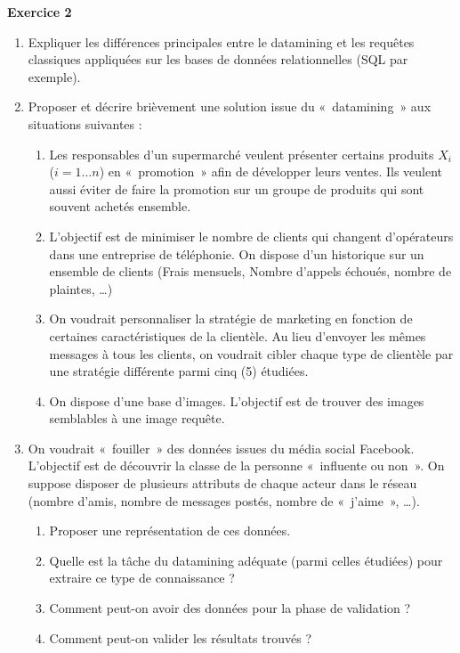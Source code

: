 \documentclass[a4paper,14pt]{article}
\begin{document}
    \vspace{1cm}
    \noindent
    \textbf{Exercice 2}
    
    \begin{enumerate}[leftmargin=*, label=\arabic*)]
        \item Expliquer les différences principales entre le datamining et les requêtes classiques appliquées sur les bases de données relationnelles (SQL par exemple).
        
        \item Proposer et décrire brièvement une solution issue du «~datamining~» aux situations suivantes :
        \begin{enumerate}[label=\alph*)]
            \item Les responsables d’un supermarché veulent présenter certains produits \( X_i \) (\( i = 1 \ldots n \)) en «~promotion~» afin de développer leurs ventes. Ils veulent aussi éviter de faire la promotion sur un groupe de produits qui sont souvent achetés ensemble.
            
            \item L’objectif est de minimiser le nombre de clients qui changent d’opérateurs dans une entreprise de téléphonie. On dispose d’un historique sur un ensemble de clients (Frais mensuels, Nombre d’appels échoués, nombre de plaintes, \ldots)
            
            \item On voudrait personnaliser la stratégie de marketing en fonction de certaines caractéristiques de la clientèle. Au lieu d’envoyer les mêmes messages à tous les clients, on voudrait cibler chaque type de clientèle par une stratégie différente parmi cinq (5) étudiées.
            
            \item On dispose d’une base d’images. L’objectif est de trouver des images semblables à une image requête.
        \end{enumerate}
        
        \item On voudrait «~fouiller~» des données issues du média social Facebook. L’objectif est de découvrir la classe de la personne «~influente ou non~». On suppose disposer de plusieurs attributs de chaque acteur dans le réseau (nombre d’amis, nombre de messages postés, nombre de «~j'aime~», \ldots).
        \begin{enumerate}[label=\alph*)]
            \item Proposer une représentation de ces données.
            \item Quelle est la tâche du datamining adéquate (parmi celles étudiées) pour extraire ce type de connaissance ?
            \item Comment peut-on avoir des données pour la phase de validation ?
            \item Comment peut-on valider les résultats trouvés ?
        \end{enumerate}
    \end{enumerate}
\end{document}

